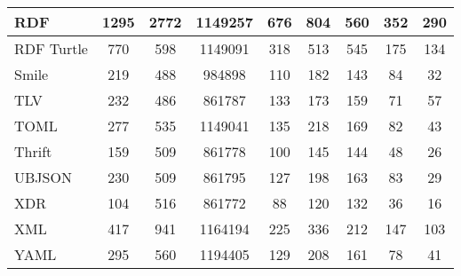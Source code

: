 \documentclass[10pt]{IEEEtran}
\begin{document}
{\begin{table*}[th]
\begin{tabular}{|p{21mm}|c|c|c|c|c|c|c|c|}
    RDF & 1295 & 2772 & 1149257 & 676 & 804 & 560 & 352 & 290 \\ \hline
    RDF Turtle & 770 & 598 & 1149091 & 318 & 513 & 545 & 175 & 134 \\ \hline
    Smile & 219 & 488 & 984898 & 110 & 182 & 143 & 84 & 32 \\ \hline
    TLV & 232 & 486 & 861787 & 133 & 173 & 159 & 71 & 57 \\ \hline
    TOML & 277 & 535 & 1149041 & 135 & 218 & 169 & 82 & 43 \\ \hline
    Thrift & 159 & 509 & 861778 & 100 & 145 & 144 & 48 & 26 \\ \hline
    UBJSON & 230 & 509 & 861795 & 127 & 198 & 163 & 83 & 29 \\ \hline
    XDR & 104 & 516 & 861772 & 88 & 120 & 132 & 36 & 16 \\ \hline
    XML & 417 & 941 & 1164194 & 225 & 336 & 212 & 147 & 103 \\ \hline
    YAML & 295 & 560 & 1194405 & 129 & 208 & 161 & 78 & 41 \\ \hline
    \end{tabular}
\end{table*}}
\end{document}
